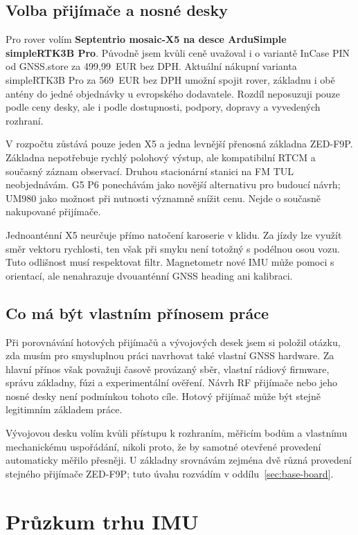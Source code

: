 \subsection{Volba přijímače a nosné desky}

Pro rover volím \textbf{Septentrio mosaic-X5 na desce ArduSimple
simpleRTK3B Pro}. Původně jsem kvůli ceně uvažoval i o variantě InCase PIN
od GNSS.store za 499,99~EUR bez DPH. Aktuální nákupní varianta simpleRTK3B Pro
za 569~EUR bez DPH umožní spojit rover, základnu i obě antény do jedné
objednávky u evropského dodavatele. Rozdíl neposuzuji pouze podle ceny desky,
ale i podle dostupnosti, podpory, dopravy a vyvedených rozhraní.
\cite{gnssstore-x5-incase,ardusimple-x5}

V rozpočtu zůstává pouze jeden X5 a jedna levnější přenosná základna ZED-F9P.
Základna nepotřebuje rychlý polohový výstup, ale kompatibilní RTCM a současný
záznam observací. Druhou stacionární stanici na FM TUL neobjednávám. G5 P6
ponechávám jako novější alternativu pro budoucí návrh; UM980 jako možnost
při nutnosti významně snížit cenu. Nejde o současně nakupované přijímače.

Jednoanténní X5 neurčuje přímo natočení karoserie v klidu. Za jízdy lze
využít směr vektoru rychlosti, ten však při smyku není totožný s podélnou osou
vozu. Tuto odlišnost musí respektovat filtr. Magnetometr nové IMU může pomoci
s orientací, ale nenahrazuje dvouanténní GNSS heading ani kalibraci.


\subsection{Co má být vlastním přínosem práce}

Při porovnávání hotových přijímačů a vývojových desek jsem si položil
otázku, zda musím pro smysluplnou práci navrhovat také vlastní GNSS
hardware. Za hlavní přínos však považuji časově provázaný sběr, vlastní
rádiový firmware, správu základny, fúzi a experimentální ověření.
Návrh RF přijímače nebo jeho nosné desky není podmínkou tohoto cíle.
Hotový přijímač může být stejně legitimním základem práce.

Vývojovou desku volím kvůli přístupu k rozhraním, měřicím bodům a vlastnímu
mechanickému uspořádání, nikoli proto, že by samotné otevřené provedení
automaticky měřilo přesněji. U základny srovnávám zejména dvě různá
provedení stejného přijímače ZED-F9P; tuto úvahu rozvádím v
oddílu~\ref{sec:base-board}.

\section{Průzkum trhu IMU}

